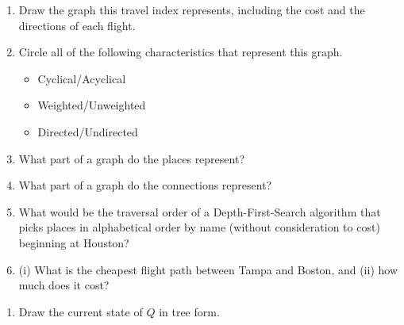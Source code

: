 \documentclass[11pt,addpoints]{exam}
\begin{document}
\begin{questions}
\begin{enumerate}[label=(\Alph*)]
  \item Draw the graph this travel index represents, including the cost and the directions of each flight.


\newpage

  \item Circle all of the following characteristics that represent this graph.

  \begin{itemize}
    \item Cyclical/Acyclical
    \item Weighted/Unweighted
    \item Directed/Undirected \\
  \end{itemize}

  \item What part of a graph do the places represent?


  \item What part of a graph do the connections represent?


  \item What would be the traversal order of a Depth-First-Search algorithm that picks places in alphabetical order by name (without consideration to cost) beginning at Houston?



  \item (i) What is the cheapest flight path between Tampa and Boston, and (ii) how much does it cost?



\end{enumerate}

\newpage


\begin{enumerate}[label=(\Alph*)]
  \item Draw the current state of $Q$ in tree form.


\end{enumerate}
\end{questions}
\end{document}
